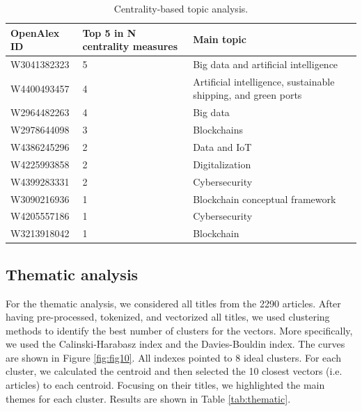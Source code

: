 \documentclass[a4paper, review, endfloat, authoryear]{elsarticle}
\begin{document}
	\begin{table}[h]
		\centering
		\caption{Centrality-based topic analysis.}
		\begin{tabularx}{\linewidth}{XXX}
			\hline
			OpenAlex ID & Top 5 in N centrality measures & Main topic \\
			\hline
			W3041382323	& 5 & Big data and artificial intelligence\\
			W4400493457	& 4 & Artificial intelligence, sustainable shipping, and green ports\\
			W2964482263	& 4 & Big data\\
			W2978644098	& 3 & Blockchains\\
			W4386245296	& 2 & Data and IoT\\
			W4225993858	& 2 & Digitalization\\
			W4399283331	& 2 & Cybersecurity\\
			W3090216936	& 1 & Blockchain conceptual framework\\
			W4205557186	& 1 & Cybersecurity\\
			W3213918042	& 1 & Blockchain\\
			\hline
		\end{tabularx}
		\label{tab:citationcentrality}
	\end{table}
		
	\subsection{Thematic analysis}
	For the thematic analysis, we considered all titles from the 2290 articles. After having pre-processed, tokenized, and vectorized all titles, we used clustering methods to identify the best number of clusters for the vectors. More specifically, we used the Calinski-Harabasz index and the Davies-Bouldin index. The curves are shown in Figure \ref{fig:fig10}. All indexes pointed to 8 ideal clusters. For each cluster, we calculated the centroid and then selected the 10 closest vectors (i.e. articles) to each centroid. Focusing on their titles, we highlighted the main themes for each cluster. Results are shown in Table \ref{tab:thematic}.
	
\end{document}
